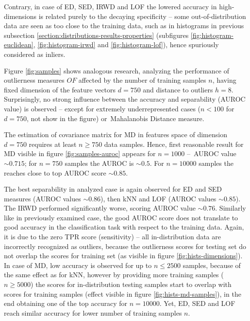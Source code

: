 Contrary, in case of ED, SED, IRWD and LOF the lowered accuracy in high-dimensions is related purely to the decaying specificity – some out-of-distribution data are seen as too close to the training data, such as in histograms in previous subsection \ref{section:distributions-results-properties} (subfigures \ref{fig:histogram-euclidean}, \ref{fig:histogram-irwd} and \ref{fig:histogram-lof}), hence spuriously considered as inliers.

Figure \ref{fig:samples} shows analogous research, analyzing the performance of outlierness measures $OF$ affected by the number of training samples $n$, having fixed dimension of the feature vectors $d = 750$ and distance to outliers $h = 8$. Surprisingly, no strong influence between the accuracy and separability (AUROC value) is observed – except for extremely underrepresented cases ($n < 100$ for $d = 750$, not show in the figure) or~Mahalanobis Distance measure.

The estimation of covariance matrix for MD in features space of dimension $d = 750$ requires at least $n \geq 750$ data samples. Hence, first reasonable result for MD visible in figure \ref{fig:samples-auroc} appears for $n = 1000$ –~AUROC value ${\sim}0.715$; for $n = 750$ samples the AUROC is ${\sim}0.5$. For $n = 10000$ samples the reaches close to top AUROC score ${\sim}0.85$.

The best separability in analyzed case is again observed for ED and SED measures (AUROC values ${\sim}0.86$), then kNN and LOF (AUROC values ${\sim}0.85$). The IRWD performed significantly worse, scoring AUROC value ${\sim}0.76$. Similarly like in previously examined case, the good AUROC score does not translate to good accuracy in the classification task with respect to the training data. Again, it is due to the zero TPR score (sensitivity) – all in-distribution data are incorrectly recognized as outliers, because the outlierness scores for testing set do not overlap the scores for training set (as visible in figure \ref{fig:hists-dimensions}). In case of MD, low accuracy is observed for up to $n \leq 2500$ samples, because of the same effect as for kNN, however by providing more training samples ($n \geq 5000$) the scores for in-distribution testing samples start to overlap with scores for training samples (effect visible in figure \ref{fig:hists-md-samples}), in the end obtaining one of the top accuracy for $n = 10000$. Yet, ED, SED and LOF reach similar accuracy for lower number of training samples $n$.

